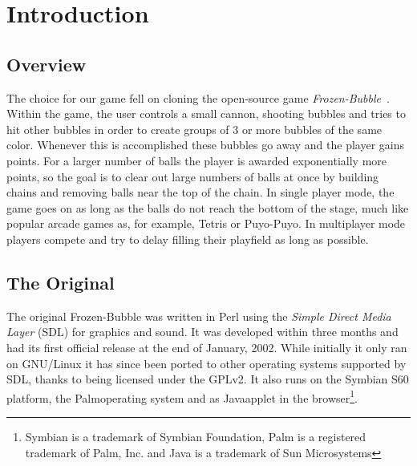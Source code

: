 \section{Introduction}
\subsection{Overview}
%
The choice for our game fell on cloning the open-source game \emph{Frozen-Bubble}~\cite{website:frozenbubble}. 
%
%
Within the game, the user controls a small cannon, shooting bubbles and tries to 
hit other bubbles in order to create groups of 3 or more bubbles of the same color. 
Whenever this is accomplished these bubbles go away and the player gains points. 
For a larger number of balls the 
player is awarded exponentially more points, so the goal is to clear out large numbers 
of balls at once by building chains and removing balls near the top of the chain.
In single player mode, the game goes on as long as the balls do not reach the bottom 
of the stage, much like popular arcade games as, for example, Tetris or Puyo-Puyo.
In multiplayer mode players compete and try to delay filling their playfield 
as long as possible.
%
\subsection{The Original}
The original Frozen-Bubble was written in Perl using the \emph{Simple Direct Media Layer} (SDL)
for graphics and sound. It was developed within three months and had its first official 
release at the end of January, 2002. While initially it only ran on GNU/Linux it has since
been ported to other operating systems supported by SDL, thanks to being licensed under the GPLv2.
It also runs on the Symbian\trademark
S60 platform, the Palm\registered operating system and as Java\trademark applet in the 
browser\footnote{Symbian is a trademark of Symbian Foundation, Palm is a registered trademark 
of Palm, Inc. and Java is a trademark of Sun Microsystems}. 

